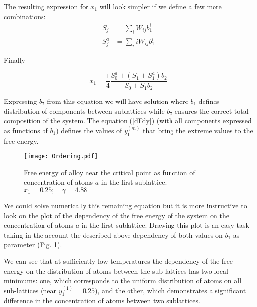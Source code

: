 \documentclass[12pt,abstract]{scrartcl}
\begin{document}
The resulting expression for $x_1$ will look simpler if we define a few more combinations:
\begin{equation} \label{S}
\begin{split}
S_j &= \sum_i W_{i j} b_1^i\\
S_j^a &= \sum_i i W_{i j} b_1^i
\end{split}
\end{equation}


Finally

\begin{equation} \label{x14}
x_1 = \frac{1}{4} \frac{S_0^a + (S_1 + S_1^a) b_2}{S_0 + S_1 b_2}
\end{equation}

Expressing  $b_2$ from this equation we will have solution where $b_1$ defines distribution of components between sublattices while $b_2$ ensures the correct total composition of the system.
The equation (\ref{dFdy}) (with all components expressed as functions of $b_1$) defines the values of $y_1^{(m)}$ that bring the extreme values to the free energy.


\begin{figure}[ht]
\texttt{[image: Ordering.pdf]}
\centering 
\caption{Free energy of alloy near the critical point as function of concentration of atoms $a$ in the first sublattice.\\
$x_1 = 0.25; \quad \gamma = 4.88$
}
\label{fig:Ordering}
\end{figure}

We could solve numerically this remaining equation but it is more instructive to look on the plot of the dependency of the free energy of the system on the concentration of atoms $a$ in the first sublattice. 
Drawing this plot is an easy task taking in the account the described above dependency of both values on $b_1$ as parameter (Fig. 1).


We can see that at sufficiently low  temperatures the dependency of the free energy on the distribution of atoms between the sub-lattices has two local minimums: one, which corresponds to the uniform distribution of atoms on all sub-lattices (near $y_1^{(1)} = 0.25$), and the other,  which demonstrates a significant difference in the concentration of atoms between two sublattices.
\end{document}

